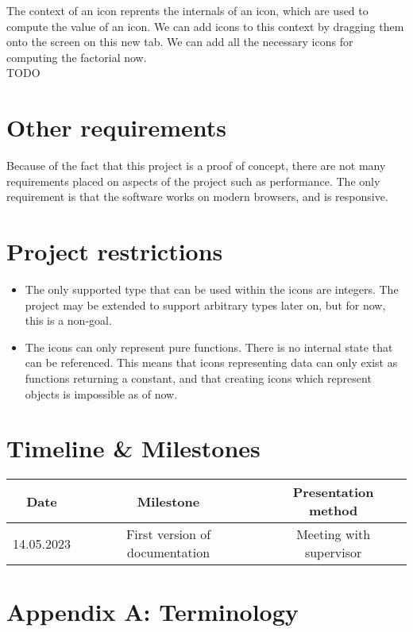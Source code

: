\documentclass{article}
\begin{document}
        The context of an icon reprents the internals of an icon, which are used to compute the value of an icon. We
        can add icons to this context by dragging them onto the screen on this new tab. We can add all the necessary
        icons for computing the factorial now.\\

        \Large TODO \normalsize




    \section{Other requirements}
        Because of the fact that this project is a proof of concept, there are not many requirements placed
        on aspects of the project such as performance. The only requirement is that the software works on modern
        browsers, and is responsive.

    \section{Project restrictions}
        \begin{itemize}

            \item
                The only supported type that can be used within the icons are integers. The project may be extended
                to support arbitrary types later on, but for now, this is a non-goal.

            \item
                The icons can only represent pure functions. There is no internal state that can be referenced. This
                means that icons representing data can only exist as functions returning a constant, and that creating
                icons which represent objects is impossible as of now.

        \end{itemize}


    \section{Timeline \& Milestones}
        \begin{tabular}{ | c | c | c | }
            \hline
            Date & Milestone & Presentation method\\
            \hline

            14.05.2023 & First version of documentation & Meeting with supervisor \\


            \hline

        \end{tabular}



    \section*{Appendix A: Terminology}
\end{document}

